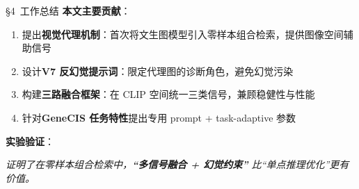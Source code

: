\documentclass[aspectratio=169,12pt]{beamer}
\newcommand{\cmark}{\textcolor{tongjiGreen}{\ding{51}}}
\begin{document}
\begin{frame}[shrink=10]{\S4~工作总结}
\textbf{本文主要贡献}：
\begin{enumerate}\small
  \item[\cmark] 提出\textbf{视觉代理机制}：首次将文生图模型引入零样本组合检索，提供图像空间辅助信号
  \item[\cmark] 设计\textbf{V7 反幻觉提示词}：限定代理图的诊断角色，避免幻觉污染
  \item[\cmark] 构建\textbf{三路融合框架}：在 CLIP 空间统一三类信号，兼顾稳健性与性能
  \item[\cmark] 针对\textbf{GeneCIS 任务特性}提出专用 prompt + task-adaptive 参数
\end{enumerate}

\vspace{0.8em}
\textbf{实验验证}：
\begin{center}
\end{center}

\vspace{0.5em}
\begin{center}\small\textit{证明了在零样本组合检索中，\textbf{``多信号融合 + 幻觉约束''} 比``单点推理优化''更有价值。}
\end{center}
\end{frame}
\end{document}
